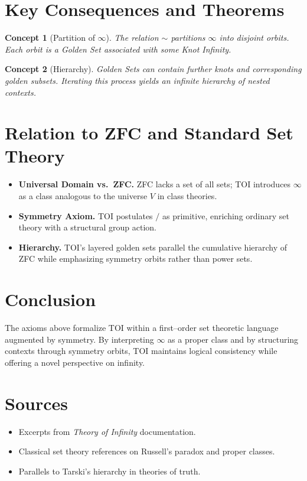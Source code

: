 \documentclass[11pt]{article}
\newtheorem{concept}{Concept}
\newcommand{\symtry}{\mathbin{/}}
\begin{document}
\section*{Key Consequences and Theorems}
\begin{concept}[Partition of $\infty$]
The relation $\sim$ partitions $\infty$ into disjoint orbits.  Each orbit is a Golden Set associated with some Knot Infinity.
\end{concept}

\begin{concept}[Hierarchy]
Golden Sets can contain further knots and corresponding golden subsets.  Iterating this process yields an infinite hierarchy of nested contexts.
\end{concept}

\section*{Relation to ZFC and Standard Set Theory}
\begin{itemize}
  \item \textbf{Universal Domain vs.~ZFC.}  ZFC lacks a set of all sets; TOI introduces $\infty$ as a class analogous to the universe $V$ in class theories.
  \item \textbf{Symmetry Axiom.}  TOI postulates $\symtry$ as primitive, enriching ordinary set theory with a structural group action.
  \item \textbf{Hierarchy.}  TOI's layered golden sets parallel the cumulative hierarchy of ZFC while emphasizing symmetry orbits rather than power sets.
\end{itemize}

\section*{Conclusion}
The axioms above formalize TOI within a first--order set theoretic language augmented by symmetry.  By interpreting $\infty$ as a proper class and by structuring contexts through symmetry orbits, TOI maintains logical consistency while offering a novel perspective on infinity.

\section*{Sources}
\begin{itemize}
  \item Excerpts from \emph{Theory of Infinity} documentation.
  \item Classical set theory references on Russell's paradox and proper classes.
  \item Parallels to Tarski's hierarchy in theories of truth.
\end{itemize}
\end{document}
